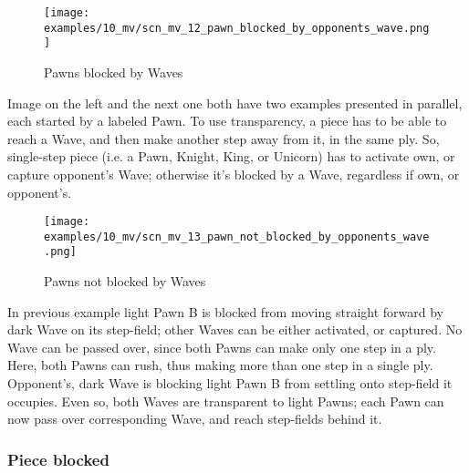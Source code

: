 \vspace*{-0.7\baselineskip}
\noindent
\begin{wrapfigure}[13]{l}{0.4\textwidth}
\centering
\texttt{[image: examples/10\_mv/scn\_mv\_12\_pawn\_blocked\_by\_opponents\_wave.png]}
\vspace*{-1.4\baselineskip}
\caption{Pawns blocked by Waves}
\label{fig:scn_mv_12_pawn_blocked_by_opponents_wave}
\end{wrapfigure}
Image on the left and the next one both have two examples presented in parallel,
each started by a labeled Pawn. \newline
\indent
To use transparency, a piece has to be able to reach a Wave, and then make another
step away from it, in the same ply. So, single-step piece (i.e. a Pawn, Knight, King,
or Unicorn) has to activate own, or capture opponent's Wave; otherwise it's blocked
by a Wave, regardless if own, or opponent's.

\vspace*{1.1\baselineskip}
\noindent
\begin{wrapfigure}[16]{l}{0.4\textwidth}
\centering
\texttt{[image: examples/10\_mv/scn\_mv\_13\_pawn\_not\_blocked\_by\_opponents\_wave.png]}
\vspace*{-1.4\baselineskip}
\caption{Pawns not blocked by Waves}
\label{fig:scn_mv_13_pawn_not_blocked_by_opponents_wave}
\end{wrapfigure}
In previous example light Pawn B is blocked from moving straight forward by dark
Wave on its step-field; other Waves can be either activated, or captured. No Wave
can be passed over, since both Pawns can make only one step in a ply. \newline
\indent
Here, both Pawns can rush, thus making more than one step in a single ply. Opponent's,
dark Wave is blocking light Pawn B from settling onto step-field it occupies. Even so,
both Waves are transparent to light Pawns; each Pawn can now pass over corresponding
Wave, and reach step-fields behind it.

\clearpage %

\subsubsection*{Piece blocked}
\label{sec:Miranda's veil/Wave/Activation/Piece blocked}

